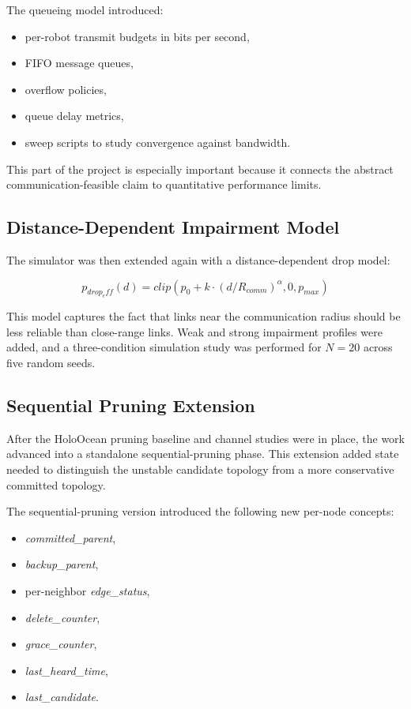 \documentclass[11pt,a4paper]{article}
\begin{document}
The queueing model introduced:
\begin{itemize}
  \item per-robot transmit budgets in bits per second,
  \item FIFO message queues,
  \item overflow policies,
  \item queue delay metrics,
  \item sweep scripts to study convergence against bandwidth.
\end{itemize}

This part of the project is especially important because it connects the abstract communication-feasible claim to quantitative performance limits.

\subsection{Distance-Dependent Impairment Model}

The simulator was then extended again with a distance-dependent drop model:

\[
p_{drop_eff}(d) = \mathit{clip}(p_0 + k \cdot (d / R_{comm})^\alpha, 0, p_{max})
\]

This model captures the fact that links near the communication radius should be less reliable than close-range links. Weak and strong impairment profiles were added, and a three-condition simulation study was performed for \(N = 20\) across five random seeds.

\subsection{Sequential Pruning Extension}

After the HoloOcean pruning baseline and channel studies were in place, the work advanced into a standalone sequential-pruning phase. This extension added state needed to distinguish the unstable candidate topology from a more conservative committed topology.

The sequential-pruning version introduced the following new per-node concepts:
\begin{itemize}
  \item \textit{committed\_parent},
  \item \textit{backup\_parent},
  \item per-neighbor \textit{edge\_status},
  \item \textit{delete\_counter},
  \item \textit{grace\_counter},
  \item \textit{last\_heard\_time},
  \item \textit{last\_candidate}.
\end{itemize}
\end{document}
